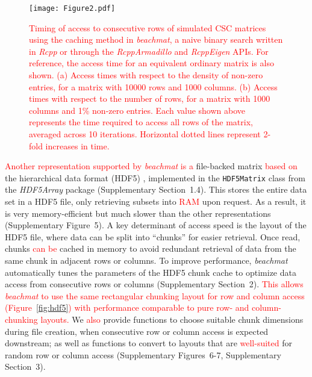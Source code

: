 \documentclass[10pt,letterpaper]{article}
\newcommand{\suppfighdfspeed}{5}
\newcommand{\suppfighdfrandom}{6-7}
\newcommand{\suppsechdfmat}{1.4}
\newcommand{\suppseclayoutoptim}{2}
\newcommand{\suppseclayoutrandom}{3}
\newcommand{\beachmat}{\textit{beachmat}}
\newcommand{\revised}[1]{\textcolor{red}{#1}}
\begin{document}
\begin{figure}[btp]
    \begin{center}
        \texttt{[image: Figure2.pdf]}
    \end{center}
    \caption{\revised{Timing of access to consecutive rows of simulated CSC matrices using the caching method in \beachmat{}, a naive binary search written in \textit{Rcpp} or through the \textit{RcppArmadillo} and \textit{RcppEigen} APIs.
For reference, the access time for an equivalent ordinary matrix is also shown.
(a) Access times with respect to the density of non-zero entries, for a matrix with 10000 rows and 1000 columns.
(b) Access times with respect to the number of rows, for a matrix with 1000 columns and 1\% non-zero entries.
Each value shown above represents the time required to access all rows of the matrix, averaged across 10 iterations.
Horizontal dotted lines represent 2-fold increases in time.}}
\label{fig:sparse}
\end{figure}

\revised{Another representation supported by \beachmat{} is a} file-backed matrix \revised{based on} the hierarchical data format (HDF5) \cite{hdf5}, 
implemented in the \texttt{HDF5Matrix} class from the \textit{HDF5Array} package (Supplementary Section~\suppsechdfmat{}).
This stores the entire data set in a HDF5 file, only retrieving subsets into \revised{RAM} upon request.
As a result, it is very memory-efficient but much slower than the other representations (Supplementary Figure~\suppfighdfspeed{}).
A key determinant of access speed is the layout of the HDF5 file, where data can be split into ``chunks'' for easier retrieval.
Once read, chunks \revised{can be} cached in memory to avoid redundant retrieval of data from the same chunk in adjacent rows or columns.
To improve performance, \beachmat{} automatically tunes the parameters of the HDF5 chunk cache to optimize data access from consecutive rows or columns (Supplementary Section~\suppseclayoutoptim{}).
\revised{This allows \beachmat{} to use the same rectangular chunking layout for row and column access (Figure~\ref{fig:hdf5}) with performance comparable to pure row- and column-chunking layouts.}
We \revised{also} provide functions to choose suitable chunk dimensions during file creation, when consecutive row or column access is expected downstream;
as well as functions to convert to layouts that are \revised{well-suited} for random row or column access (Supplementary Figures~\suppfighdfrandom{}, Supplementary Section~\suppseclayoutrandom{}).
\end{document}
